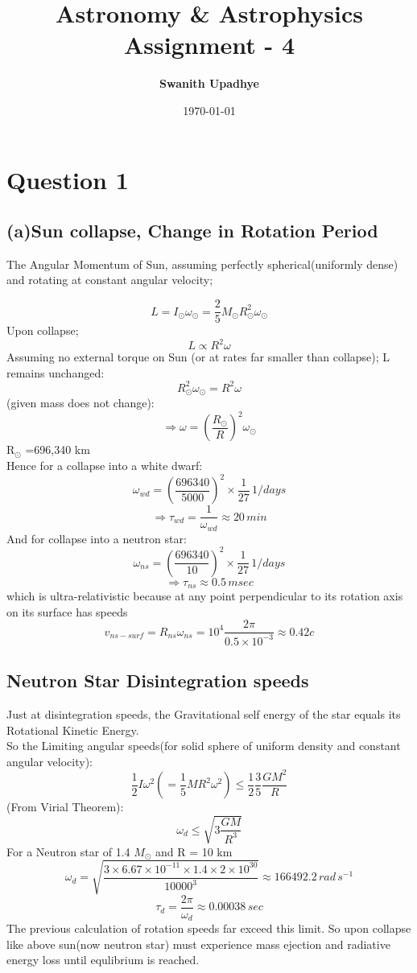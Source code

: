 \documentclass[11pt]{article}
\title{Astronomy \& Astrophysics Assignment - 4}
\author{\textbf{\Large Swanith Upadhye}}
\date{\today}
\begin{document}
	
	\maketitle
	\noindent\hrulefill
	\Large
	
	\section{\color{teal} Question 1}
	\subsection{(a)Sun collapse, Change in Rotation Period}
	
	The Angular Momentum of Sun, assuming perfectly spherical(uniformly dense) and rotating at constant angular velocity;
	
	\[
		L = I_\odot \omega_\odot = \frac{2}{5} M_\odot R_\odot^2 \omega_\odot
	\]
	Upon collapse;
	\[
		L \propto R^2 \omega
	\]
	Assuming no external torque on Sun (or at rates far smaller than collapse); L remains unchanged:
	\[
		R_\odot^2 \omega_\odot = R^2 \omega
	\]
	(given mass does not change):
	\[
		\Rightarrow \omega = (\frac{R_\odot}{R})^2 \omega_\odot
	\]
	R$_\odot$ =696,340 km\\
	Hence for a collapse into a white dwarf:
	\[
		\omega_{wd} = (\frac{696340}{5000})^2 \times \frac{1}{27} \, 1/days
	\]
	\[
		\Rightarrow \boxed{\tau_{wd} = \frac{1}{\omega_{wd}} \approx 20 \, min}
	\]
	And for collapse into a neutron star:
	\[
		\omega_{ns} = (\frac{696340}{10})^2 \times \frac{1}{27} \, 1/days
	\]
	\[
		\Rightarrow \boxed{\tau_{ns} \approx 0.5 \, msec}
	\]
	which is ultra-relativistic because at any point perpendicular to its rotation axis on its surface has speeds
	\[
		v_{ns-surf} = R_{ns} \omega_{ns} = 10^4 \frac{2\pi}{0.5 \times 10^{-3}} \approx 0.42 c
	\]
	
	\subsection{Neutron Star Disintegration speeds}
	
	Just at disintegration speeds, the Gravitational self energy of the star equals its Rotational Kinetic Energy.\\
	So the Limiting angular speeds(for solid sphere of uniform density and constant angular velocity):
	\[
		\frac{1}{2} I \omega^2 (= \frac{1}{5}MR^2\omega^2)\le \frac{1}{2}\frac{3}{5}\frac{GM^2}{R}
	\]
	(From Virial Theorem):
	\[
		\omega_d \le \sqrt{3\frac{GM}{R^3}}
	\]
	For a Neutron star of 1.4 $M_\odot$ and R = 10 km 
	\[
		\omega_d = \sqrt{\frac{3\times 6.67\times 10^{-11}\times 1.4\times 2\times 10^{30}}{10000^3}} \approx 166492.2 \, rad \, s^{-1}
	\]
	\[
		\boxed{\tau_d = \frac{2\pi}{\omega_d} \approx 0.00038  \,sec}
	\]
	The previous calculation of rotation speeds far exceed this limit. So upon collapse like above sun(now neutron star) must experience mass ejection and radiative energy loss until equlibrium is reached.
	
\end{document}
